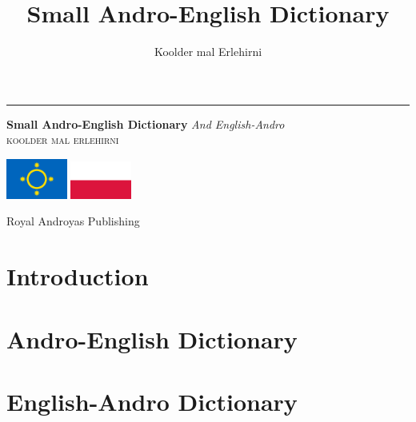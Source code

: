 \documentclass[openany, twoside, b5paper]{book}
\begin{document}
\author{Koolder mal Erlehirni}
\title{Small Andro-English Dictionary}

\frontmatter

\begin{titlepage} %
    \newcommand*{\plogo}{\fbox{$\mathcal{AND}$}} %
    
	\raggedleft %
	
	\rule{1pt}{\textheight} %
	\hspace{0.05\textwidth} %
	\parbox[b]{0.75\textwidth}{ %
		
        {\Huge\bfseries Small Andro-English Dictionary}
        {\large\textit{And English-Andro}}\\[4\baselineskip]
		{\Large\textsc{koolder mal erlehirni}} %
        
        \bigskip

        \includegraphics[width=2cm]{androyas-flag}
        \includegraphics[width=2cm]{pl-flag}

        \vspace{0.5\textheight} %
		
		{\noindent Royal Androyas Publishing~~\plogo}\\[\baselineskip] %
	}

\end{titlepage}

\clearpage


\tableofcontents

\mainmatter
\chapter{Introduction}


\chapter{Andro-English Dictionary}


\chapter{English-Andro Dictionary}


\backmatter
\end{document}
